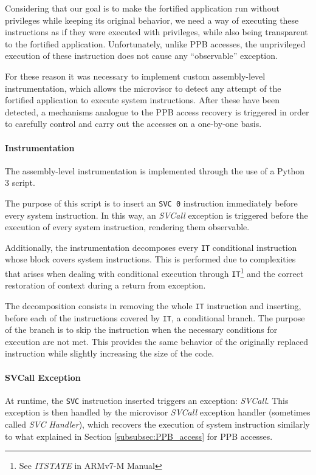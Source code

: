 \documentclass{article}
\begin{document}
Considering that our goal is to make the fortified application run without privileges while keeping its original behavior, we need a way of executing these instructions as if they were executed with privileges, while also being transparent to the fortified application. Unfortunately, unlike PPB accesses, the unprivileged execution of these instruction does not cause any ``observable'' exception.

For these reason it was necessary to implement custom assembly-level instrumentation, which allows the microvisor to detect any attempt of the fortified application to execute system instructions. After these have been detected, a mechanisms analogue to the PPB access recovery is triggered in order to carefully control and carry out the accesses on a one-by-one basis.

\paragraph{Instrumentation}
The assembly-level instrumentation is implemented through the use of a Python 3 script.

The purpose of this script is to insert an \verb|SVC 0| instruction immediately before every system instruction. In this way, an \textit{SVCall} exception is triggered before the execution of every system instruction, rendering them  observable.

Additionally, the instrumentation decomposes every \verb|IT| conditional instruction whose block covers system instructions. This is performed due to complexities that arises when dealing with conditional execution through \verb|IT|\footnote{See \textit{ITSTATE} in ARMv7-M Manual\cite{armv7m}} and the correct restoration of context during a return from exception.

The decomposition consists in removing the whole \verb|IT| instruction and inserting, before each of the instructions covered by \verb|IT|, a conditional branch. The purpose of the branch is to skip the instruction when the necessary conditions for execution are not met. This provides the same behavior of the originally replaced instruction while slightly increasing the size of the code.

\paragraph{SVCall Exception}
At runtime, the \verb|SVC| instruction inserted triggers an exception: \textit{SVCall}. This exception is then handled by the microvisor \textit{SVCall} exception handler (sometimes called \textit{SVC Handler}), which recovers the execution of system instruction similarly to what explained in Section \ref{subsubsec:PPB_access} for PPB accesses.
\end{document}
